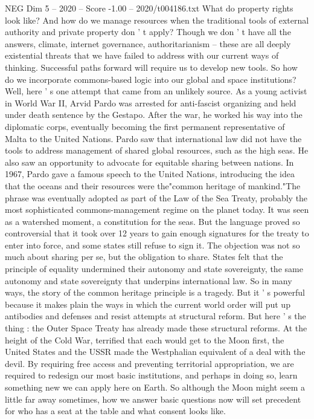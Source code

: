 \begin{textsample}{NEG Dim 5 – 2020 – Score -1.00 – 2020/t004186.txt}
What do property rights look like?
And how do we manage resources when the traditional tools of external authority and private property don ' t apply?
Though we don ' t have all the answers, climate, internet governance, authoritarianism -- these are all deeply existential threats that we have failed to address with our current ways of thinking.
Successful paths forward will require us to develop new tools.
So how do we incorporate commons-based logic into our global and space institutions?
Well, here ' s one attempt that came from an unlikely source.
As a young activist in World War II, Arvid Pardo was arrested for anti-fascist organizing and held under death sentence by the Gestapo.
After the war, he worked his way into the diplomatic corps, eventually becoming the first permanent representative of Malta to the United Nations.
Pardo saw that international law did not have the tools to address management of shared global resources, such as the high seas.
He also saw an opportunity to advocate for equitable sharing between nations.
In 1967, Pardo gave a famous speech to the United Nations, introducing the idea that the oceans and their resources were the"common heritage of mankind."The phrase was eventually adopted as part of the Law of the Sea Treaty, probably the most sophisticated commons-management regime on the planet today.
It was seen as a watershed moment, a constitution for the seas.
But the language proved so controversial that it took over 12 years to gain enough signatures for the treaty to enter into force, and some states still refuse to sign it.
The objection was not so much about sharing per se, but the obligation to share.
States felt that the principle of equality undermined their autonomy and state sovereignty, the same autonomy and state sovereignty that underpins international law.
So in many ways, the story of the common heritage principle is a tragedy.
But it ' s powerful because it makes plain the ways in which the current world order will put up antibodies and defenses and resist attempts at structural reform.
But here ' s the thing : the Outer Space Treaty has already made these structural reforms.
At the height of the Cold War, terrified that each would get to the Moon first, the United States and the USSR made the Westphalian equivalent of a deal with the devil.
By requiring free access and preventing territorial appropriation, we are required to redesign our most basic institutions, and perhaps in doing so, learn something new we can apply here on Earth.
So although the Moon might seem a little far away sometimes, how we answer basic questions now will set precedent for who has a seat at the table and what consent looks like.

\end{textsample}
